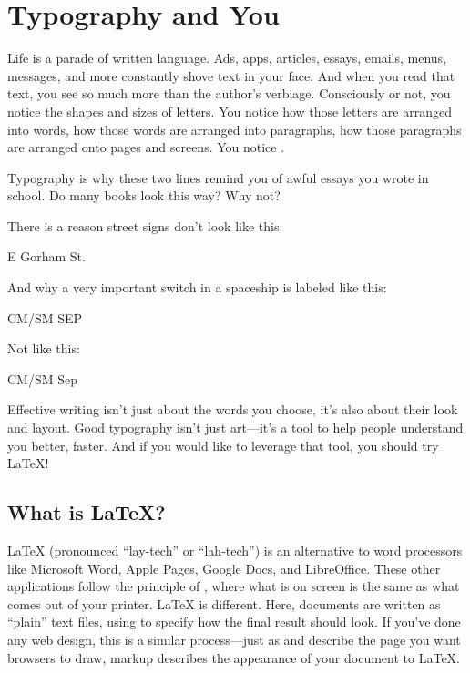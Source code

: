 \chapter{Typography and You}
\label{typography}

Life is a parade of written language.
Ads, apps, articles, essays, emails, menus, messages, and more
constantly shove text in your face.
And when you read that text, you see so much more than the author's
verbiage.
Consciously or not, you notice the shapes and sizes of letters.
You notice how those letters are arranged into words,
how those words are arranged into paragraphs,
how those paragraphs are arranged onto pages and screens.
You notice .
\begin{leftfigure}
\fontsize{12bp}{24bp}\selectfont\raggedright
Typography is why these two lines remind you of awful essays
you wrote in school.
Do many books look this way? Why not?
\end{leftfigure}
\medskip
\noindent There is a reason street signs don't look like this:
\begin{leftfigure}
\Large E Gorham St.
\end{leftfigure}
And why a very important switch in a spaceship is labeled like this:
\begin{leftfigure}
CM/SM SEP
\end{leftfigure}
Not like this:
\begin{leftfigure}
\Large CM/SM Sep
\end{leftfigure}
Effective writing isn't just about the words you choose,
it's also about their look and layout.
Good typography isn't just art---it's a tool to help people understand you
better, faster.
And if you would like to leverage that tool, you should try \LaTeX!
\clearpage

\section{What is \texorpdfstring{\LaTeX}{LaTeX}?}

\LaTeX{} (pronounced ``lay-tech'' or ``lah-tech'') is an
alternative to word processors like Microsoft Word,
Apple Pages, Google Docs, and LibreOffice.
These other applications follow the principle of
, where what is on screen is the same
as what comes out of your printer.
\LaTeX{} is different. Here, documents are written as
``plain'' text files, using 
to specify how the final result should look.
If you've done any web design, this is a similar
process---just as  and 
describe the page you want browsers to draw,
markup describes the appearance of your document to \LaTeX.

